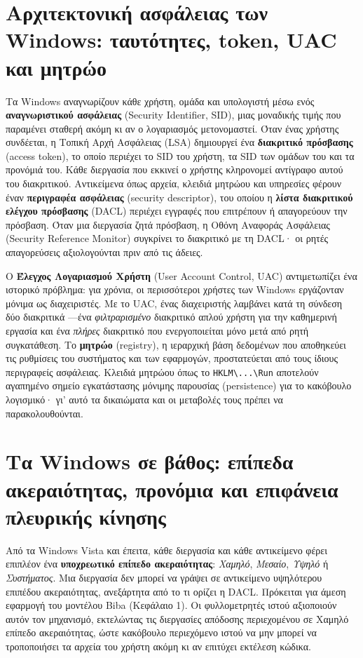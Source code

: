 \documentclass[11pt,openany]{book}
\begin{document}
\section{Αρχιτεκτονική ασφάλειας των Windows: ταυτότητες, token, UAC και μητρώο}\label{sec:2.4}
Τα Windows αναγνωρίζουν κάθε χρήστη, ομάδα και υπολογιστή μέσω ενός \textbf{αναγνωριστικού ασφάλειας} (Security Identifier, SID), μιας μοναδικής τιμής που παραμένει σταθερή ακόμη κι αν ο λογαριασμός μετονομαστεί. Όταν ένας χρήστης συνδέεται, η Τοπική Αρχή Ασφάλειας (LSA) δημιουργεί ένα \textbf{διακριτικό πρόσβασης} (access token), το οποίο περιέχει το SID του χρήστη, τα SID των ομάδων του και τα προνόμιά του. Κάθε διεργασία που εκκινεί ο χρήστης κληρονομεί αντίγραφο αυτού του διακριτικού. Αντικείμενα όπως αρχεία, κλειδιά μητρώου και υπηρεσίες φέρουν έναν \textbf{περιγραφέα ασφάλειας} (security descriptor), του οποίου η \textbf{λίστα διακριτικού ελέγχου πρόσβασης} (DACL) περιέχει εγγραφές που επιτρέπουν ή απαγορεύουν την πρόσβαση. Όταν μια διεργασία ζητά πρόσβαση, η Οθόνη Αναφοράς Ασφάλειας (Security Reference Monitor) συγκρίνει το διακριτικό με τη DACL· οι ρητές απαγορεύσεις αξιολογούνται πριν από τις άδειες.

Ο \textbf{Έλεγχος Λογαριασμού Χρήστη} (User Account Control, UAC) αντιμετωπίζει ένα ιστορικό πρόβλημα: για χρόνια, οι περισσότεροι χρήστες των Windows εργάζονταν μόνιμα ως διαχειριστές. Με το UAC, ένας διαχειριστής λαμβάνει κατά τη σύνδεση δύο διακριτικά —ένα \emph{φιλτραρισμένο} διακριτικό απλού χρήστη για την καθημερινή εργασία και ένα \emph{πλήρες} διακριτικό που ενεργοποιείται μόνο μετά από ρητή συγκατάθεση. Το \textbf{μητρώο} (registry), η ιεραρχική βάση δεδομένων που αποθηκεύει τις ρυθμίσεις του συστήματος και των εφαρμογών, προστατεύεται από τους ίδιους περιγραφείς ασφάλειας. Κλειδιά μητρώου όπως το \texttt{HKLM\textbackslash{}...\textbackslash{}Run} αποτελούν αγαπημένο σημείο εγκατάστασης μόνιμης παρουσίας (persistence) για το κακόβουλο λογισμικό· γι' αυτό τα δικαιώματα και οι μεταβολές τους πρέπει να παρακολουθούνται.

\section{Τα Windows σε βάθος: επίπεδα ακεραιότητας, προνόμια και επιφάνεια πλευρικής κίνησης}\label{sec:2.5}
Από τα Windows Vista και έπειτα, κάθε διεργασία και κάθε αντικείμενο φέρει επιπλέον ένα \textbf{υποχρεωτικό επίπεδο ακεραιότητας}: \emph{Χαμηλό}, \emph{Μεσαίο}, \emph{Υψηλό} ή \emph{Συστήματος}. Μια διεργασία δεν μπορεί να γράψει σε αντικείμενο υψηλότερου επιπέδου ακεραιότητας, ανεξάρτητα από το τι ορίζει η DACL. Πρόκειται για άμεση εφαρμογή του μοντέλου Biba (Κεφάλαιο 1). Οι φυλλομετρητές ιστού αξιοποιούν αυτόν τον μηχανισμό, εκτελώντας τις διεργασίες απόδοσης περιεχομένου σε Χαμηλό επίπεδο ακεραιότητας, ώστε κακόβουλο περιεχόμενο ιστού να μην μπορεί να τροποποιήσει τα αρχεία του χρήστη ακόμη κι αν επιτύχει εκτέλεση κώδικα.
\end{document}
